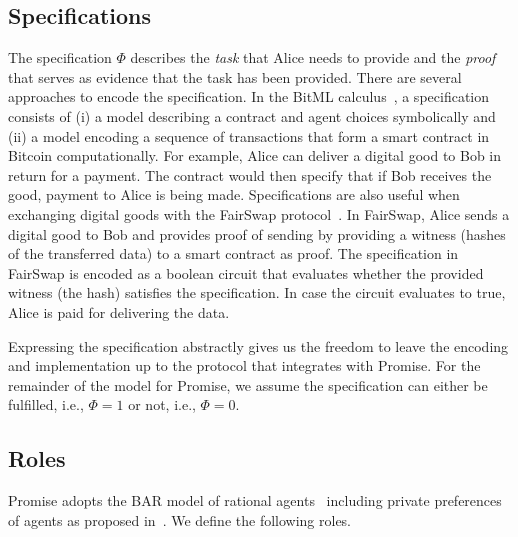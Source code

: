 \documentclass[runningheads]{llncs}
\newcommand{\sys}{Promise\xspace}
\begin{document}
\subsection{Specifications}
The specification $\Phi$ describes the \emph{task} that Alice needs to provide and the \emph{proof} that serves as evidence that the task has been provided.
There are several approaches to encode the specification.
In the BitML calculus~\cite{Bartoletti2018}, a specification consists of (i) a model describing a contract and agent choices symbolically and (ii) a model encoding a sequence of transactions that form a smart contract in Bitcoin computationally.
For example, Alice can deliver a digital good to Bob in return for a payment.
The contract would then specify that if Bob receives the good, payment to Alice is being made.
Specifications are also useful when exchanging digital goods with the FairSwap protocol~\cite{Dziembowski2018FairSwap}.
In FairSwap, Alice sends a digital good to Bob and provides proof of sending by providing a witness (hashes of the transferred data) to a smart contract as proof.
The specification in FairSwap is encoded as a boolean circuit that evaluates whether the provided witness (the hash) satisfies the specification.
In case the circuit evaluates to true, Alice is paid for delivering the data.

Expressing the specification abstractly gives us the freedom to leave the encoding and implementation up to the protocol that integrates with \sys.
For the remainder of the model for \sys, we assume the specification can either be fulfilled, i.e., $\Phi = 1$ or not, i.e., $\Phi = 0$.


\subsection{Roles}

\sys adopts the BAR model of rational agents~\cite{aiyer2005bar} including private preferences of agents as proposed in~\cite{Harz2019Balance}.
We define the following roles.
\end{document}
